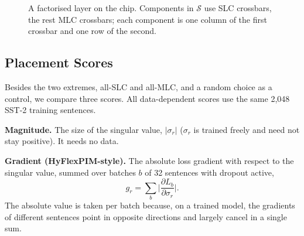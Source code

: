 \begin{figure}[t]
\centering
{}
\caption{A factorised layer on the chip. Components in $\mathcal S$ use SLC crossbars, the rest MLC
crossbars; each component is one column of the first crossbar and one row of the second.}
\label{fig:tiers}
\end{figure}

\subsection{Placement Scores}
Besides the two extremes, all-SLC and all-MLC, and a random choice as a control, we compare three scores.
All data-dependent scores use the same 2{,}048 SST-2 training sentences.

\textbf{Magnitude.} The size of the singular value, $|\sigma_r|$ ($\sigma_r$ is trained freely and need
not stay positive). It needs no data.

\textbf{Gradient (HyFlexPIM-style).} The absolute loss gradient with respect to the singular value,
summed over batches $b$ of 32 sentences with dropout active,
\begin{equation}
g_r=\sum_b\Big|\frac{\partial L_b}{\partial\sigma_r}\Big|.
\label{eq:grad}
\end{equation}
The absolute value is taken per batch because, on a trained model, the gradients of different sentences
point in opposite directions and largely cancel in a single sum.


